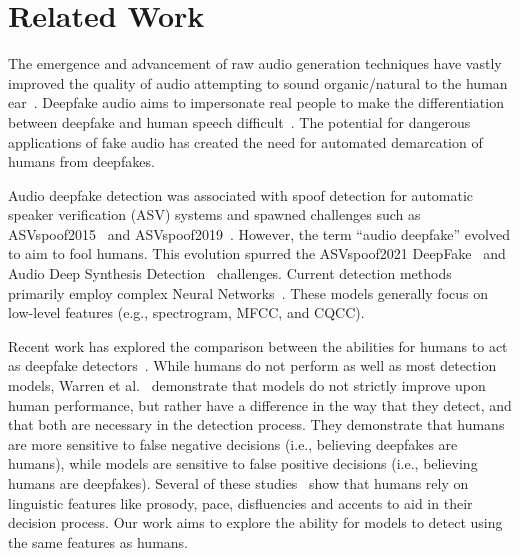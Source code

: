 \documentclass[10pt, journal, anonymous=true]{IEEEtran}
\begin{document}
\section{Related Work} 
\label{sec:relwork} 
 
The emergence and advancement of raw audio generation techniques have vastly improved the quality of audio attempting to sound organic/natural to the human ear~\cite{oord_wavenet_2016, oord_parallel_2017,baird2018the,kim_flowavenet_2019}.  Deepfake audio aims to impersonate real people to make the differentiation between deepfake and human speech
difficult~\cite{lorenzo-trueba_can_2018, SaundersDetectingDF}.  The potential for dangerous applications of fake audio has created the need for automated demarcation of humans from deepfakes. 

Audio deepfake detection was associated with spoof detection for automatic speaker verification (ASV) systems and spawned challenges such as ASVspoof2015~\cite{wu_asvspoof_2015} and ASVspoof2019~\cite{todisco_asvspoof_2019}.  However, the term ``audio
deepfake'' evolved to aim to fool humans.  This evolution spurred the
ASVspoof2021 DeepFake~\cite{yamagishi_asvspoof_2021} and Audio Deep Synthesis Detection~\cite{yi2022add}  challenges. Current detection methods primarily employ complex Neural Networks~\cite{
wang2020deepsonar,wang2021investigating, wijethunga_deepfake_2020,jiang2020self,subramani2020learning,zhang2021fake, khalid2021evaluation,tak2022automatic,martin2022vicomtech}.  These models generally focus on low-level features (e.g., spectrogram, MFCC, and CQCC). 


Recent work has explored the comparison between the abilities for humans to act as deepfake detectors~\cite{muller2022,warning_humans,wenger2021,allyour}. While humans do not perform as well as most detection models, Warren et al.~\cite{WTC_24} demonstrate that models do not strictly improve upon human performance, but rather have a difference in the way that they detect, and that both are necessary in the detection process. They demonstrate that humans are more sensitive to false negative decisions (i.e., believing deepfakes are humans), while models are sensitive to false positive decisions (i.e., believing humans are deepfakes). Several of these studies~\cite{WTC_24,warning_humans} show that humans rely on linguistic features like prosody, pace, disfluencies and accents to aid in their decision process. Our work aims to explore the ability for models to detect using the same features as humans. 
\end{document}
